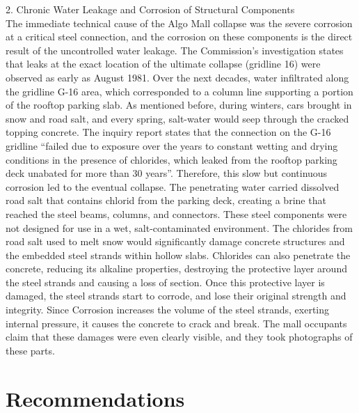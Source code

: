 \documentclass[12pt]{article}
\begin{document}
2. Chronic Water Leakage and Corrosion of Structural Components \\
The immediate technical cause of the Algo Mall collapse was the severe corrosion at a critical steel connection, and the corrosion on these components is the direct result of the uncontrolled water leakage. The Commission’s investigation states that leaks at the exact location of the ultimate collapse (gridline 16) were observed as early as August 1981. Over the next decades, water infiltrated along the gridline G-16 area, which corresponded to a column line supporting a portion of the rooftop parking slab. As mentioned before, during winters, cars brought in snow and road salt, and every spring, salt-water would seep through the cracked topping concrete. The inquiry report states that the connection on the G-16 gridline “failed due to exposure over the years to constant wetting and drying conditions in the presence of chlorides, which leaked from the rooftop parking deck unabated for more than 30 years”. Therefore, this slow but continuous corrosion led to the eventual collapse.
The penetrating water carried dissolved road salt that contains chlorid from the parking deck, creating a brine that reached the steel beams, columns, and connectors. These steel components were not designed for use in a wet, salt-contaminated environment. The chlorides from road salt used to melt snow would significantly damage concrete structures and the embedded steel strands within hollow slabs. Chlorides can also penetrate the concrete, reducing its alkaline properties, destroying the protective layer around the steel strands and causing a loss of section. Once this protective layer is damaged, the steel strands start to corrode, and lose their original strength and integrity. Since Corrosion increases the volume of the steel strands, exerting internal pressure, it causes the concrete to crack and break. The mall occupants claim that these damages were even clearly visible, and they took photographs of these parts.


\section{Recommendations}
\end{document}
